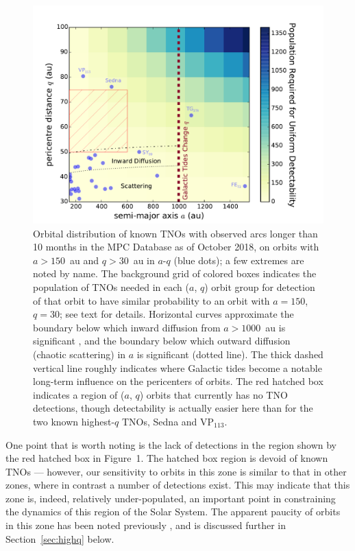 \documentclass[preprint]{aastex62}
\begin{document}
\begin{figure}
\includegraphics[width=\textwidth]{figures/figure1.pdf}
\caption{Orbital distribution of known TNOs with observed arcs longer than 10 months in the MPC Database as of October 2018, on orbits with $a > 150$~au and $q > 30$~au in $a$-$q$ (blue dots); a few extremes are noted by name. 
The background grid of colored boxes indicates the population of TNOs needed in each ($a$, $q$) orbit group for detection of that orbit to have similar probability to an orbit with $a = 150$, $q = 30$; see text for details.
Horizontal curves approximate the boundary below which inward diffusion from $a > 1000$~au is significant \citep[dot-dash line;][]{bannister17}, and the boundary below which outward diffusion (chaotic scattering) in $a$ is significant (dotted line). 
The thick dashed vertical line roughly indicates where Galactic tides become a notable long-term influence on the pericenters of orbits.
The red hatched box indicates a region of ($a$, $q$) orbits that currently has no TNO detections, though detectability is actually easier here than for the two known highest-$q$ TNOs, Sedna and VP$_{113}$.
}
\label{fig:bias}
\end{figure}


One point that is worth noting is the lack of detections in the region shown by the red hatched box in Figure~1.  The hatched box region is devoid of known TNOs --- however, our sensitivity to orbits in this zone is similar to that in other zones, where in contrast a number of detections exist. 
This may indicate that this zone is, indeed, relatively under-populated, an important point in constraining the dynamics of this region of the Solar System.  The apparent paucity of orbits in this zone has been noted previously \citep[e.g.][]{trujillosheppard14,bannister18}, and is discussed further in Section~\ref{sec:highq} below.
\end{document}
